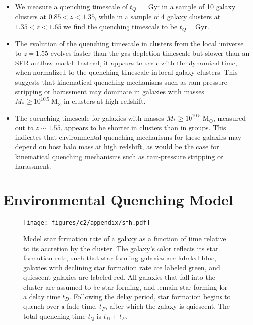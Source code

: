 \begin{itemize}


\item
We measure a quenching timescale of $t_Q= $\gresult{} Gyr in a sample of 10 galaxy clusters at $0.85 < z < 1.35$, while in a sample of 4 galaxy clusters at $1.35 < z < 1.65$ we find the quenching timescale to be $t_Q=$\hiresult Gyr.

\item
The evolution of the quenching timescale in clusters from the local universe to $z=1.55$ evolves faster than the gas depletion timescale but slower than an SFR outflow model.
Instead, it appears to scale with the dynamical time, when normalized to the quenching timescale in local galaxy clusters.
This suggests that kinematical quenching mechanisms such as ram-pressure stripping or harassment may dominate in galaxies with masses $M_* \geq 10^{10.5}~ \mathrm{M}_\odot$ in clusters at high redshift.


\item
The quenching timescale for galaxies with masses $M_* \geq 10^{10.5}~ \mathrm{M}_\odot$, measured out to $z\sim1.55$, appears to be shorter in clusters than in groups.
This indicates that environmental quenching mechanisms for these galaxies may depend on host halo mass at high redshift, as would be the case for kinematical quenching mechanisms such as ram-pressure stripping or harassment.

\end{itemize}



\section{Environmental Quenching Model}\label{sec-math}

\begin{figure}[h!]
\centering \texttt{[image: figures/c2/appendix/sfh.pdf]}
\caption[Toy model of star formation history of a quenched galaxy]{Model star formation rate of a galaxy as a function of time relative to its accretion by the cluster.
The galaxy's color reflects its star formation rate, such that star-forming galaxies are labeled blue, galaxies with declining star formation rate are labeled green, and quiescent galaxies are labeled red.
All galaxies that fall into the cluster are assumed to be star-forming, and remain star-forming for a delay time $t_D$.
Following the delay period, star formation begins to quench over a fade time, $t_F$, after which the galaxy is quiescent.
The total quenching time $t_Q$ is $t_D + t_F$.
\label{fig-a-sfh}}
\end{figure}

